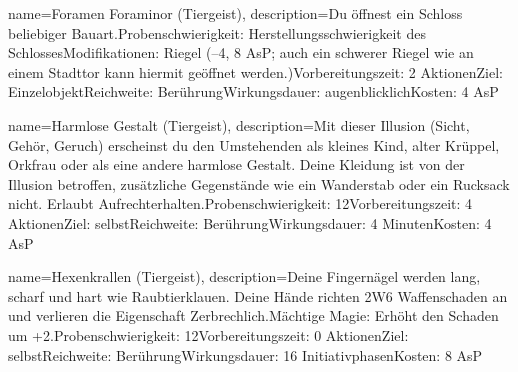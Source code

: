 {
    name={Foramen Foraminor (Tiergeist)},
    description={Du öffnest ein Schloss beliebiger Bauart.\newline Probenschwierigkeit: Herstellungsschwierigkeit des Schlosses\newline Modifikationen: Riegel (–4, 8 AsP; auch ein schwerer Riegel wie an einem Stadttor kann hiermit geöffnet werden.)\newline Vorbereitungszeit: 2 Aktionen\newline Ziel: Einzelobjekt\newline Reichweite: Berührung\newline Wirkungsdauer: augenblicklich\newline Kosten: 4 AsP}
}


{
    name={Harmlose Gestalt (Tiergeist)},
    description={Mit dieser Illusion (Sicht, Gehör, Geruch) erscheinst du den Umstehenden als kleines Kind, alter Krüppel, Orkfrau oder als eine andere harmlose Gestalt. Deine Kleidung ist von der Illusion betroffen, zusätzliche Gegenstände wie ein Wanderstab oder ein Rucksack nicht. Erlaubt Aufrechterhalten.\newline Probenschwierigkeit: 12\newline Vorbereitungszeit: 4 Aktionen\newline Ziel: selbst\newline Reichweite: Berührung\newline Wirkungsdauer: 4 Minuten\newline Kosten: 4 AsP}
}


{
    name={Hexenkrallen (Tiergeist)},
    description={Deine Fingernägel werden lang, scharf und hart wie Raubtierklauen. Deine Hände richten 2W6 Waffenschaden an und verlieren die Eigenschaft Zerbrechlich.\newline Mächtige Magie: Erhöht den Schaden um +2.\newline Probenschwierigkeit: 12\newline Vorbereitungszeit: 0 Aktionen\newline Ziel: selbst\newline Reichweite: Berührung\newline Wirkungsdauer: 16 Initiativphasen\newline Kosten: 8 AsP}
}


